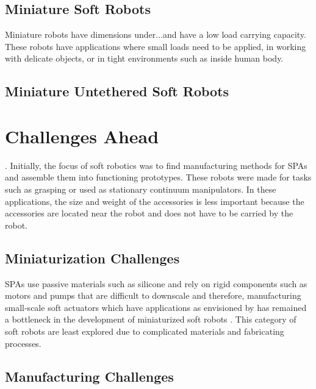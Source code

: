 \subsection{Miniature Soft Robots}
Miniature robots have dimensions under...and have a low load carrying capacity. These robots have applications where small loads need to be applied, in working with delicate objects, or in tight environments such as inside human body. 
\subsection{Miniature Untethered Soft Robots}

\section{Challenges Ahead}.
Initially, the focus of soft robotics was to find manufacturing methods for SPAs and assemble them into functioning prototypes. These robots were made for tasks such as grasping or used as stationary continuum manipulators. In these applications, the size and weight of the accessories is less important because the accessories are located near the robot and does not have to be carried by the robot. 
\subsection{Miniaturization Challenges}
SPAs use passive materials such as silicone and rely on rigid components such as motors and pumps that are difficult to downscale and therefore, manufacturing small-scale soft actuators which have applications as envisioned by \cite{hines2017soft} has remained a bottleneck in the development of miniaturized soft robots \cite{majidi2019soft}. This category of soft robots are least explored due to complicated materials and fabricating processes.  
\subsection{Manufacturing Challenges}

